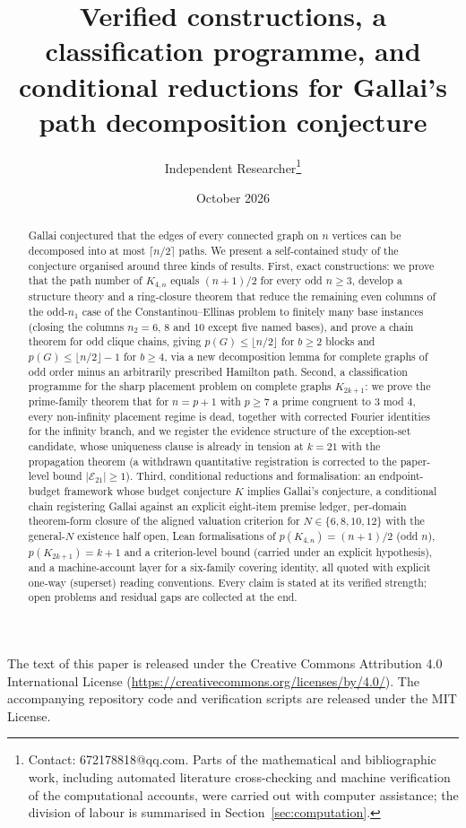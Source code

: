 \documentclass[11pt]{article}
\title{Verified constructions, a classification programme, and conditional
reductions for Gallai's path decomposition conjecture}
\author{Independent Researcher\thanks{Contact: 672178818@qq.com. Parts of the
mathematical and bibliographic work, including automated literature
cross-checking and machine verification of the computational accounts, were
carried out with computer assistance; the division of labour is summarised in
Section~\ref{sec:computation}.}}
\date{October 2026}
\theoremstyle{plain}
\theoremstyle{definition}
\theoremstyle{remark}
\newcommand{\licensernote}{The text of this paper is released under the
Creative Commons Attribution 4.0 International License
(\url{https://creativecommons.org/licenses/by/4.0/}). The accompanying
repository code and verification scripts are released under the MIT License.}
\begin{document}
\maketitle

\begin{center}\small\licensernote\end{center}

\begin{abstract}
Gallai conjectured that the edges of every connected graph on $n$ vertices can
be decomposed into at most $\lceil n/2\rceil$ paths. We present a self-contained
study of the conjecture organised around three kinds of results. First, exact
constructions: we prove that the path number of $K_{4,n}$ equals $(n+1)/2$ for
every odd $n\ge 3$, develop a structure theory and a ring-closure theorem that
reduce the remaining even columns of the odd-$n_1$ case of the
Constantinou--Ellinas problem to finitely many base instances (closing the
columns $n_2=6$, $8$ and $10$ except five named bases), and prove a chain
theorem for odd clique chains, giving $p(G)\le\lfloor n/2\rfloor$ for $b\ge2$
blocks and $p(G)\le\lfloor n/2\rfloor-1$ for $b\ge4$, via a new decomposition
lemma for complete graphs of odd order minus an arbitrarily prescribed
Hamilton path. Second, a classification programme for the sharp placement
problem on complete graphs $K_{2k+1}$: we prove the prime-family theorem that
for $n=p+1$ with $p\ge7$ a prime congruent to $3$ mod $4$, every non-infinity
placement regime is dead, together with corrected Fourier identities for the
infinity branch, and we register the evidence structure of the exception-set
candidate, whose uniqueness clause is already in tension at $k=21$ with the
propagation theorem (a withdrawn quantitative registration is corrected to the
paper-level bound $|\mathcal{E}_{21}|\ge1$). Third, conditional reductions and
formalisation: an endpoint-budget framework whose budget conjecture $K$ implies
Gallai's conjecture, a conditional chain registering Gallai against an explicit
eight-item premise ledger, per-domain theorem-form closure of the aligned
valuation criterion for $N\in\{6,8,10,12\}$ with the general-$N$ existence half open,
Lean formalisations of $p(K_{4,n})=(n+1)/2$ (odd $n$), $p(K_{2k+1})=k+1$ and a
criterion-level bound (carried under an explicit hypothesis), and a machine-account
layer for a six-family
covering identity, all quoted with explicit one-way (superset) reading
conventions. Every claim is stated at its verified strength; open problems and
residual gaps are collected at the end.
\end{abstract}

\tableofcontents









\end{document}
